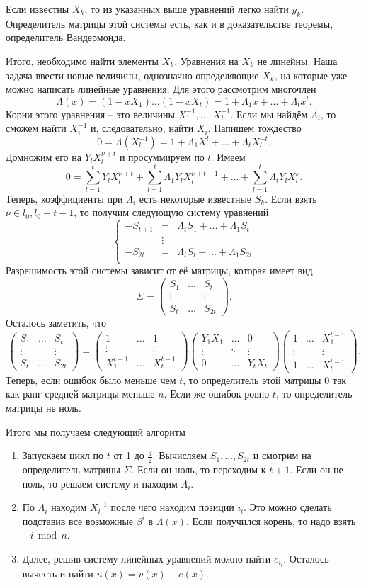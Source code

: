 \documentclass[10pt,a4paper,oneside]{book}
\theoremstyle{definition}
\renewcommand{\mod}{\,\operatorname{mod}\,}
\newcommand{\ovl}{\overline}
\def\enm{\begin{enumerate}}
\def\eenm{\end{enumerate}}
\def\pmat{\begin{pmatrix}}
\def\epmat{\end{pmatrix}}
\begin{document}
Если известны $X_k$, то из указанных выше уравнений легко найти $y_k$. Определитель матрицы этой системы есть, как и в доказательстве теоремы, определитель Вандермонда.

Итого, необходимо найти элементы $X_k$. Уравнения на $X_k$ не линейны. Наша задача ввести новые величины, однозначно определяющие $X_k$, на которые уже можно написать линейные уравнения. Для этого рассмотрим многочлен 
$$\Lambda(x)=(1-xX_1)\dots(1-xX_t)= 1+\Lambda_1x+\dots+\Lambda_tx^t.$$
Корни этого уравнения -- это величины $X_1^{-1},\dots,X_t^{-1}$. Если мы найдём $\Lambda_i$, то сможем найти $X_i^{-1}$ и, следовательно, найти $X_i$. Напишем тождество
$$0=\Lambda(X_l^{-1})=1+\Lambda_1 X^{l}+\dots+\Lambda_t X_l^{-t}.$$
Домножим его на $Y_lX_l^{\nu+t}$ и просуммируем по $l$. Имеем
$$ 0=\sum_{l=1}^t Y_lX_l^{\nu+t}+\sum_{l=1}^t\Lambda_1 Y_lX_l^{\nu+t+1}+\dots+\sum_{l=1}^t\Lambda_t Y_lX_l^{\nu}.$$
Теперь, коэффициенты при $\Lambda_i$ есть некоторые известные $S_k$. Если взять $\nu \in \ovl{l_0,l_0+t-1}$, то получим следующую систему уравнений
$$\left\{ \begin{array}{rcl}
-S_{t+1}&=& \Lambda_t S_{1}+\dots + \Lambda_1 S_{t}\\
&\vdots&\\
-S_{2t}&=& \Lambda_t S_{t}+\dots + \Lambda_1 S_{2t}\\
\end{array} \right.$$
Разрешимость этой системы зависит от её матрицы, которая имеет вид 
$$ \Sigma =\pmat
S_1 & \dots & S_t\\
\vdots & & \vdots\\
S_t & \dots & S_{2t}
\epmat.
$$
Осталось заметить, что 
$$ \pmat
S_1 & \dots & S_t\\
\vdots & & \vdots\\
S_t & \dots & S_{2t}
\epmat =  \pmat
1 & \dots & 1\\
\vdots & & \vdots\\
X_1^{t-1} & \dots & X_t^{t-1}
\epmat
\pmat
Y_1X_1 & \dots & 0\\
\vdots & \ddots& \vdots\\
0 & \dots & Y_tX_t
\epmat
\pmat
1& \dots & X_1^{t-1}\\
\vdots & & \vdots\\
1 & \dots & X_t^{t-1}
\epmat .
$$
Теперь, если ошибок было меньше чем $t$, то определитель этой матрицы 0 так как ранг средней матрицы меньше $n$. Если же ошибок ровно $t$, то определитель матрицы не ноль.

Итого мы получаем следующий алгоритм
\enm 
\item Запускаем цикл по $t$ от 1 до $\frac{d}{2}$. Вычисляем $S_1,\dots,S_{2t}$ и смотрим на определитель матрицы $\Sigma$. Если он ноль, то переходим к $t+1$. Если он не ноль, то решаем систему и находим $\Lambda_i$.
\item По $\Lambda_i$ находим $X_l^{-1}$ после чего находим позиции $i_l$. Это можно сделать подставив все возможные $\beta^i$ в $\Lambda(x)$. Если получился корень, то надо взять $-i \mod n$.  
\item Далее, решив систему линейных уравнений можно найти $e_{i_l}$. Осталось вычесть и найти $u(x)=v(x)-e(x)$.
\eenm
\end{document}
